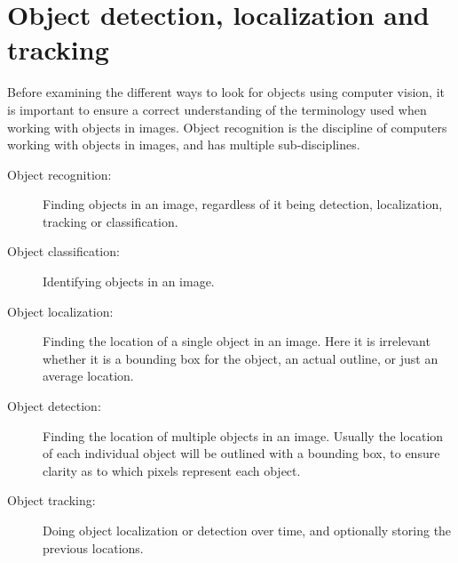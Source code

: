 \section{Object detection, localization and tracking}\label{sec:anal:objdet}
Before examining the different ways to look for objects using computer vision, it is important to ensure a correct understanding of the terminology used when working with objects in images.
Object recognition is the discipline of computers working with objects in images, and has multiple sub-disciplines\cite{objecttrackdetect}.


\begin{description}
	\item[Object recognition:] Finding objects in an image, regardless of it being detection, localization, tracking or classification. 
    \item[Object classification:] Identifying objects in an image.
    \item[Object localization:] Finding the location of a single object in an image{.} Here it is irrelevant whether it is a bounding box for the object, an actual outline, or just an average location. 
    \item[Object detection:] Finding the location of multiple objects in an image{.} Usually the location of each individual object will be outlined with a bounding box, to ensure clarity as to which pixels represent each object.
    \item[Object tracking:] Doing object localization or detection over time, and optionally storing the previous locations.
\end{description}